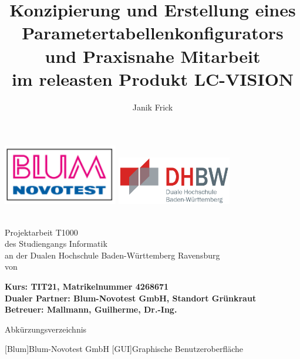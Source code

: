 \documentclass[12pt,a4paper]{article}
\author{Janik Frick}
\title{Konzipierung und Erstellung eines Parametertabellenkonfigurators und Praxisnahe Mitarbeit\\
 im releasten Produkt LC-VISION}
\newcommand{\dualerPartner}{Blum-Novotest GmbH, Standort Grünkraut}
\newcommand{\hochschule}{Dualen Hochschule Baden-Württemberg Ravensburg}
\newcommand{\betreuer}{Mallmann, Guilherme, Dr.-Ing.}
\newcommand{\studiengang}{Informatik}
\newcommand{\kurs}{TIT21, Matrikelnummer 4268671}
\begin{document}
\begin{titlepage}
\includegraphics[width=50mm,scale=1]{blum-logo.PNG}
\hfill
\includegraphics[width=50mm,scale=1]{dhbw.png}
   \begin{center}
       \textbf{\huge{\thetitle}}\\
       \vspace{2cm}
       \Large{Projektarbeit T1000\\
       des Studiengangs \studiengang\\
       an der \hochschule\\
       \vspace{1.5cm}
       von\\
       \vspace{0.5cm}
       \theauthor}
       
   \end{center}
       \vspace{1.6cm}
       \noindent
       \vspace{0.3cm}
       \textbf{\large{Kurs: \kurs}}\\
       \vspace{0.3cm}
       \textbf{\large{Dualer Partner: \dualerPartner}}\\
       \vspace{0.3cm}
       \textbf{\large{Betreuer: \betreuer}}
       

\end{titlepage}
\onehalfspacing
\noindent
{\Large Abkürzungsverzeichnis}\\
\newline
\begin{acronym}[Abkürzungsverzeichnis]
[Blum]{Blum-Novotest GmbH}
[GUI]{Graphische Benutzeroberfläche}
\end{acronym}
\newpage
\listoffigures
\newpage
\tableofcontents
\newpage
\end{document}
